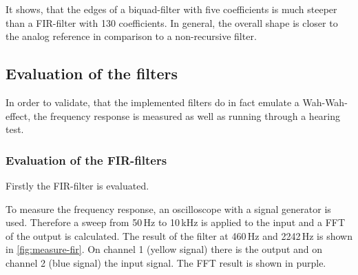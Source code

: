 It shows, that the edges of a biquad-filter with five coefficients is much steeper than a \ac{FIR}-filter
with 130 coefficients. In general, the overall shape is closer to the analog reference in comparison to
a non-recursive filter.

\subsection{Evaluation of the filters}

In order to validate, that the implemented filters do in fact emulate a Wah-Wah-effect,
the frequency response is measured as well as running through a hearing test. %

\subsubsection{Evaluation of the \ac{FIR}-filters}

Firstly the \ac{FIR}-filter is evaluated.

To measure the frequency response, an oscilloscope with a signal generator is used. Therefore a sweep
from 50\,Hz to 10\,kHz is applied to the input and a \ac{FFT} of the output is calculated. The result
of the filter at 460\,Hz and 2242\,Hz is shown in \autoref{fig:measure-fir}. On channel 1 (yellow signal)
there is the output and on channel 2 (blue signal) the input signal. The \ac{FFT} result is shown in purple.

